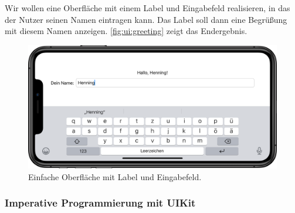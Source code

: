 Wir wollen eine Oberfläche mit einem Label und Eingabefeld realisieren, in das der Nutzer seinen Namen eintragen kann. Das Label soll dann eine Begrüßung mit diesem Namen anzeigen. \autoref{fig:ui:greeting} zeigt das Endergebnis.
\clearpage

\begin{figure}[H]
	\centering
	\includegraphics[width=.8\textwidth]{./images/methodology/swiftui/greeting_ui.png}
	\caption{\label{fig:ui:greeting}Einfache Oberfläche mit Label und Eingabefeld.}
\end{figure}

\subsubsection{Imperative Programmierung mit UIKit}


